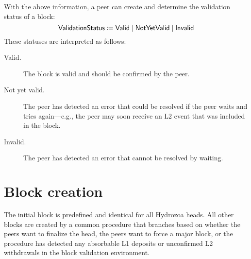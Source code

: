\documentclass[../hydrozoa.tex]{subfiles}
\begin{document}
With the above information, a peer can create and determine the validation status of a block:
\begin{equation*}
  \mathsf{ValidationStatus} \coloneq
    \mathsf{Valid} \mid
    \mathsf{NotYetValid} \mid
    \mathsf{Invalid}
\end{equation*}
These statuses are interpreted as follows:
\begin{description}
  \item[Valid.] The block is valid and should be confirmed by the peer.
  \item[Not yet valid.] The peer has detected an error that could be resolved if the peer waits and tries again---e.g., the peer may soon receive an L2 event that was included in the block.
  \item[Invalid.] The peer has detected an error that cannot be resolved by waiting.
\end{description}

\section{Block creation}%
\label{h:l2-block-creation}%

The initial block is predefined and identical for all Hydrozoa heads.
All other blocks are created by a common procedure that branches based on whether the peers want to finalize the head, the peers want to force a major block, or the procedure has detected any absorbable L1 deposits or unconfirmed L2 withdrawals in the block validation environment.
\end{document}
